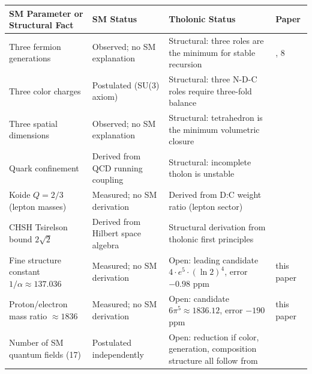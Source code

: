 \documentclass[
  11pt,
  letterpaper,
]{article}
\begin{document}
\begin{longtable}[]{@{}
  >{\raggedright\arraybackslash}p{}
  >{\raggedright\arraybackslash}p{}
  >{\raggedright\arraybackslash}p{}
  >{\raggedright\arraybackslash}p{}@{}}
\toprule\noalign{}
\begin{minipage}[b]{\linewidth}\raggedright
SM Parameter or Structural Fact
\end{minipage} & \begin{minipage}[b]{\linewidth}\raggedright
SM Status
\end{minipage} & \begin{minipage}[b]{\linewidth}\raggedright
Tholonic Status
\end{minipage} & \begin{minipage}[b]{\linewidth}\raggedright
Paper
\end{minipage} \\
\midrule\noalign{}
\endhead
\bottomrule\noalign{}
\endlastfoot
Three fermion generations & Observed; no SM explanation & Structural:
three roles are the minimum for stable recursion & 3, 8 \\
Three color charges & Postulated (SU(3) axiom) & Structural: three N-D-C
roles require three-fold balance & 8 \\
Three spatial dimensions & Observed; no SM explanation & Structural:
tetrahedron is the minimum volumetric closure & 8 \\
Quark confinement & Derived from QCD running coupling & Structural:
incomplete tholon is unstable & 8 \\
Koide \(Q = 2/3\) (lepton masses) & Measured; no SM derivation & Derived
from D:C weight ratio (lepton sector) & 8 \\
CHSH Tsirelson bound \(2\sqrt{2}\) & Derived from Hilbert space algebra
& Structural derivation from tholonic first principles & 8 \\
Fine structure constant \(1/\alpha \approx 137.036\) & Measured; no SM
derivation & Open: leading candidate \(4 \cdot e^5 \cdot (\ln 2)^4\),
error \(-0.98\) ppm & this paper \\
Proton/electron mass ratio \(\approx 1836\) & Measured; no SM derivation
& Open: candidate \(6\pi^5 \approx 1836.12\), error \(-190\) ppm & this
paper \\
Number of SM quantum fields (17) & Postulated independently & Open:
reduction if color, generation, composition structure all follow from

\end{longtable}
\end{document}
